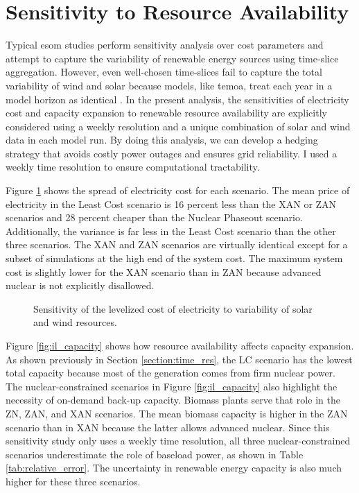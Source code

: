 \section{Sensitivity to Resource Availability}
\label{section:resource_sa}

Typical \gls{esom} studies perform sensitivity analysis over cost parameters and
attempt to capture the variability of renewable energy sources using time-slice
aggregation. However, even well-chosen time-slices fail to capture the total variability
of wind and solar because models, like \gls{temoa}, treat each year in a model
horizon as identical \cite{hunter_modeling_2013}. In the present analysis, the
sensitivities of electricity cost and capacity expansion to renewable resource
availability are explicitly considered using a weekly resolution and a unique combination
of solar and wind data in each model run. By doing this analysis, we can develop
a hedging strategy that avoids costly power outages and ensures grid reliability.
I used a weekly time resolution to ensure computational tractability.

Figure \ref{fig:obj_cost_plot} shows the spread of electricity cost for each scenario.
The mean price of electricity in the Least Cost scenario is 16 percent less than
the XAN or ZAN scenarios and 28 percent cheaper than the Nuclear Phaseout scenario.
Additionally, the variance is far less in the Least Cost scenario than the other
three scenarios. The XAN and ZAN scenarios are virtually identical
except for a subset of simulations at the high end of the system cost. The maximum
system cost is slightly lower for the XAN scenario than in ZAN because advanced
nuclear is not explicitly disallowed.

\begin{figure}[H]
  \centering
  \resizebox{0.95\columnwidth}{!}{}
  \caption{Sensitivity of the levelized cost of electricity to variability of
   solar and wind resources.}
  \label{fig:obj_cost_plot}
\end{figure}

Figure \ref{fig:il_capacity} shows how resource availability affects capacity
expansion. As shown previously in Section \ref{section:time_res}, the LC scenario
has the lowest total capacity because most of the generation comes from firm nuclear
power. The nuclear-constrained scenarios in Figure \ref{fig:il_capacity} also
highlight the necessity of on-demand back-up capacity. Biomass plants serve that role
in the ZN, ZAN, and XAN scenarios. The mean biomass capacity is higher
in the ZAN scenario than in XAN because the latter allows advanced nuclear. Since
this sensitivity study only uses a weekly time resolution, all three nuclear-constrained scenarios
underestimate the role of baseload power, as shown in Table \ref{tab:relative_error}.
The uncertainty in renewable energy capacity is also much higher for these three scenarios.


